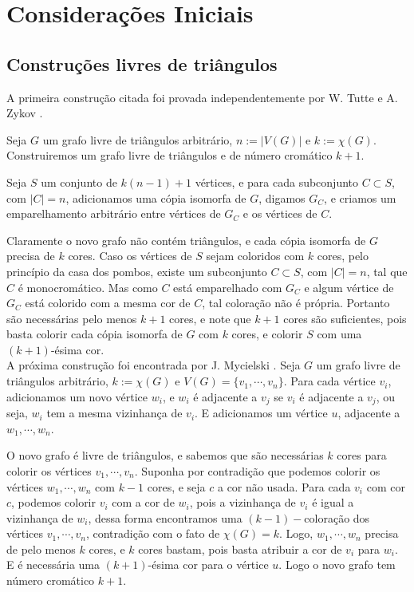 \chapter{Considerações Iniciais}
\label{cap:consiniciais}

\section{Construções livres de triângulos}

A primeira construção citada foi provada independentemente por W. Tutte \cite{descartes1947three} e A. Zykov \cite{zykov1949some}.

Seja $G$ um grafo livre de triângulos arbitrário, $n := |V(G)|$ e $k := \chi(G)$. Construiremos um grafo livre de triângulos e de número cromático $k+1$.

Seja $S$ um conjunto de $k(n-1)+1$ vértices, e para cada subconjunto $C \subset S$, com $|C| = n$, adicionamos uma cópia isomorfa de $G$, digamos $G_C$, e criamos um emparelhamento arbitrário entre vértices de $G_C$ e os vértices de $C$.

Claramente o novo grafo não contém triângulos, e cada cópia isomorfa de $G$ precisa de $k$ cores. Caso os vértices de $S$ sejam coloridos com $k$ cores, pelo princípio da casa dos pombos, existe um subconjunto $C \subset S$, com $|C| = n$, tal que $C$ é monocromático. Mas como $C$ está emparelhado com $G_C$ e algum vértice de $G_C$ está colorido com a mesma cor de $C$, tal coloração não é própria. Portanto são necessárias pelo menos $k+1$ cores, e note que $k+1$ cores são suficientes, pois basta colorir cada cópia isomorfa de $G$ com $k$ cores, e colorir $S$ com uma $(k+1)$-ésima cor.\\

A próxima construção foi encontrada por J. Mycielski \cite{mycielski1955coloriage}. Seja $G$ um grafo livre de triângulos arbitrário, $k := \chi(G)$ e $V(G) = \{v_1, \cdots, v_n\}$. Para cada vértice $v_i$, adicionamos um novo vértice $w_i$, e $w_i$ é adjacente a $v_j$ se $v_i$ é adjacente a $v_j$, ou seja, $w_i$ tem a mesma vizinhança de $v_i$. E adicionamos um vértice $u$, adjacente a $w_1, \cdots, w_n$.

O novo grafo é livre de triângulos, e sabemos que são necessárias $k$ cores para colorir os vértices $v_1, \cdots, v_n$. Suponha por contradição que podemos colorir os vértices $w_1,\cdots, w_n$ com $k-1$ cores, e seja $c$ a cor não usada. Para cada $v_i$ com cor $c$, podemos colorir $v_i$ com a cor de $w_i$, pois a vizinhança de $v_i$ é igual a vizinhança de $w_i$, dessa forma encontramos uma $(k-1)-$coloração dos vértices $v_1,\cdots,v_n$, contradição com o fato de $\chi(G) = k$. Logo, $w_1,\cdots,w_n$ precisa de pelo menos $k$ cores, e $k$ cores bastam, pois basta atribuir a cor de $v_i$ para $w_i$. E é necessária uma $(k+1)$-ésima cor para o vértice $u$. Logo o novo grafo tem número cromático $k+1$.\\

